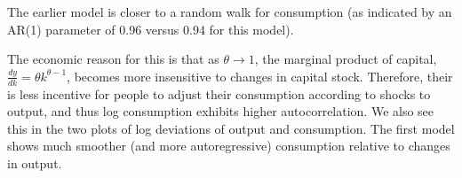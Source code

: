 \documentclass[11pt]{article}
\makeatletter
\newcommand{\boxspacing}{\kern\kvtcb@left@rule\kern\kvtcb@boxsep}
\newcommand{\prompt}[4]{
        \ttfamily\llap{{\color{#2}[#3]:\hspace{3pt}#4}}\vspace{-\baselineskip}
    }
\makeatother
\begin{document}
    The earlier model is closer to a random walk for consumption (as
indicated by an AR(1) parameter of 0.96 versus 0.94 for this model).

The economic reason for this is that as \(\theta \to 1\), the marginal
product of capital, \(\frac{dy}{dk} = \theta k^{\theta-1}\), becomes
more insensitive to changes in capital stock. Therefore, their is less
incentive for people to adjust their consumption according to shocks to
output, and thus log consumption exhibits higher autocorrelation. We
also see this in the two plots of log deviations of output and
consumption. The first model shows much smoother (and more
autoregressive) consumption relative to changes in output.

    \begin{tcolorbox}[breakable, size=fbox, boxrule=1pt, pad at break*=1mm,colback=cellbackground, colframe=cellborder]
\prompt{In}{incolor}{ }{\boxspacing}
\begin{Verbatim}[commandchars=\\\{\}]

\end{Verbatim}
\end{tcolorbox}


    
    
    
\end{document}
